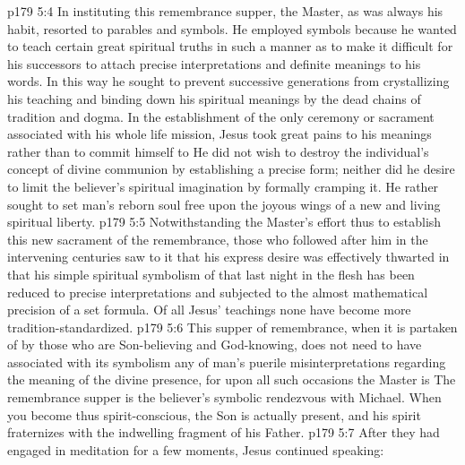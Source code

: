 \vs p179 5:4 \pc In instituting this remembrance supper, the Master, as was always his habit, resorted to parables and symbols. He employed symbols because he wanted to teach certain great spiritual truths in such a manner as to make it difficult for his successors to attach precise interpretations and definite meanings to his words. In this way he sought to prevent successive generations from crystallizing his teaching and binding down his spiritual meanings by the dead chains of tradition and dogma. In the establishment of the only ceremony or sacrament associated with his whole life mission, Jesus took great pains to  his meanings rather than to commit himself to  He did not wish to destroy the individual’s concept of divine communion by establishing a precise form; neither did he desire to limit the believer’s spiritual imagination by formally cramping it. He rather sought to set man’s reborn soul free upon the joyous wings of a new and living spiritual liberty.
\vs p179 5:5 Notwithstanding the Master’s effort thus to establish this new sacrament of the remembrance, those who followed after him in the intervening centuries saw to it that his express desire was effectively thwarted in that his simple spiritual symbolism of that last night in the flesh has been reduced to precise interpretations and subjected to the almost mathematical precision of a set formula. Of all Jesus’ teachings none have become more tradition\hyp{}standardized.
\vs p179 5:6 This supper of remembrance, when it is partaken of by those who are Son\hyp{}believing and God\hyp{}knowing, does not need to have associated with its symbolism any of man’s puerile misinterpretations regarding the meaning of the divine presence, for upon all such occasions the Master is  The remembrance supper is the believer’s symbolic rendezvous with Michael. When you become thus spirit\hyp{}conscious, the Son is actually present, and his spirit fraternizes with the indwelling fragment of his Father.
\vs p179 5:7 \pc After they had engaged in meditation for a few moments, Jesus continued speaking: 

